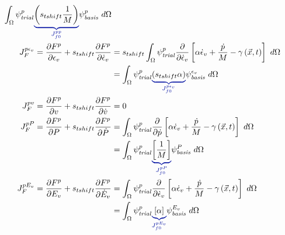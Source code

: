 \begin{align}
    \int_{\Omega} \trialscalar[p] \eqnannotate{\left(s_{tshift} \frac{1}{M}\right)}{J_{f0}^{pp}} \basisscalar[p] \ d\Omega                                                                                                                                                        \\
    J_F^{p\epsilon_{v}} = \frac{\partial F^p}{\partial \epsilon_{v}} + s_{tshift} \frac{\partial F^p}{\partial \dot{\epsilon}_{v}} & =
    s_{tshift}\int_{\Omega} \trialscalar[p] \frac{\partial}{\partial \dot{\epsilon}_{v}} \left[\alpha\dot{\epsilon}_{v} + \frac{\dot{p}}{M} - \gamma\left(\vec{x},t\right)\right] \ d\Omega                                                                                       \\
                                                                                                                                   & = \int_{\Omega} \trialscalar[p] \eqnannotate{\left(s_{tshift} \alpha \right)}{J_{f0}^{p\epsilon_{v}}} \basisscalar[\epsilon_{v}] \ d\Omega   \\
    J_F^{pv} = \frac{\partial F^p}{\partial v} + s_{tshift} \frac{\partial F^p}{\partial \dot{v}}                                  & = 0                                                                                                                                          \\
    J_F^{p P} = \frac{\partial F^p}{\partial P} + s_{tshift} \frac{\partial F^p}{\partial \dot{P}}                                 & =
    \int_{\Omega} \trialscalar[p] \frac{\partial}{\partial \dot{p}} \left[\alpha\dot{\epsilon}_{v} + \frac{\dot{p}}{M} - \gamma\left(\vec{x},t\right)\right] \ d\Omega                                                                                                            \\
                                                                                                                                   & = \int_{\Omega} \trialscalar[p] \eqnannotate{\left[ \frac{1}{M} \right]}{J_{f0}^{pP}} \basisscalar[P] \ d\Omega                              \\
    J_F^{p E_{v}} = \frac{\partial F^p}{\partial E_{v}} + s_{tshift} \frac{\partial F^p}{\partial \dot{E}_{v}}                     & =
    \int_{\Omega} \trialscalar[p] \frac{\partial}{\partial \dot{\epsilon}_{v}} \left[\alpha\dot{\epsilon}_{v} + \frac{\dot{p}}{M} - \gamma\left(\vec{x},t\right)\right] \ d\Omega                                                                                                 \\
                                                                                                                                   & = \int_{\Omega} \trialscalar[p] \eqnannotate{\left[ \alpha \right]}{J_{f0}^{pE_{v}}} \basisscalar[E_{v}] \ d\Omega                           \\
\end{align}

